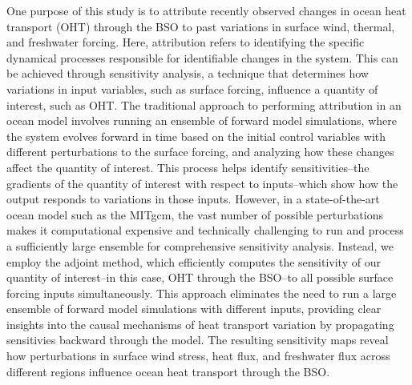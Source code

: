 \documentclass[draft]{agujournal2019}
\begin{document}
One purpose of this study is to attribute recently observed changes in ocean heat transport (OHT) through the BSO to past variations in surface wind, thermal, and freshwater forcing. Here, attribution refers to identifying the specific dynamical processes responsible for identifiable changes in the system. This can be achieved through sensitivity analysis, a technique that determines how variations in input variables, such as surface forcing, influence a quantity of interest, such as OHT. The traditional approach to performing attribution in an ocean model involves running an ensemble of forward model simulations, where the system evolves forward in time based on the initial control variables with different perturbations to the surface forcing, and analyzing how these changes affect the quantity of interest. This process helps identify sensitivities--the gradients of the quantity of interest with respect to inputs--which show how the output responds to variations in those inputs. However, in a state-of-the-art ocean model such as the MITgcm, the vast number of possible perturbations makes it computational expensive and technically challenging to run and process a sufficiently large ensemble for comprehensive sensitivity analysis. Instead, we employ the adjoint method, which efficiently computes the sensitivity of our quantity of interest--in this case, OHT through the BSO--to all possible surface forcing inputs simultaneously. This approach eliminates the need to run a large ensemble of forward model simulations with different inputs, providing clear insights into the causal mechanisms of heat transport variation by propagating sensitivies backward through the model. The resulting sensitivity maps reveal how perturbations in surface wind stress, heat flux, and freshwater flux across different regions influence ocean heat transport through the BSO.
\end{document}
